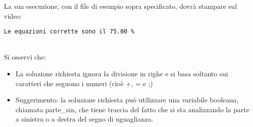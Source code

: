 \documentclass[12pt]{article}
\begin{document}
La sua esecuzione, con il file di esempio sopra specificato, dovr\`a stampare sul video:
\begin{mdframed}[backgroundcolor=lightgrey] 
\begin{verbatim}
Le equazioni corrette sono il 75.00 %
\end{verbatim}
\end{mdframed}

\mbox{}\\
Si osservi che:
\begin{itemize}
\item La soluzione richiesta ignora la divisione in righe e si basa soltanto sui caratteri che seguono i numeri (cio\`{e} +, = e ;)
\item Suggerimento: la soluzione richiesta pu\`{o} utilizzare una variabile booleana, chiamata parte\_sin, che tiene traccia del fatto che si sta analizzando la parte a sinistra o a destra del segno di uguaglianza.
\end{itemize}
\end{document}
